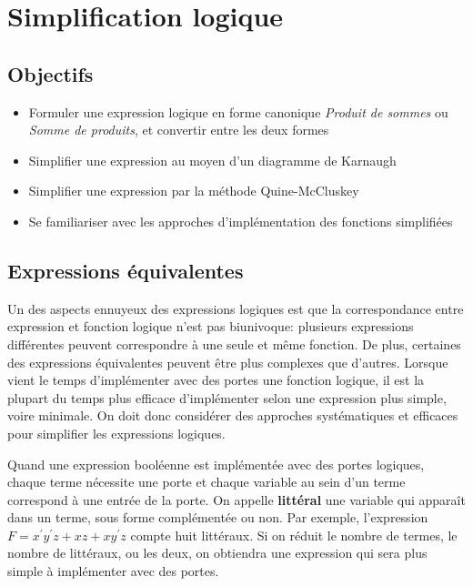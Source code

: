 \documentclass[letter, oneside]{book}
\begin{document}
\chapter{Simplification logique}
\label{sec:orgc185c51}


\section{Objectifs}
\label{sec:org7bd563f}
\begin{itemize}
\item Formuler une expression logique en forme canonique \emph{Produit
de sommes} ou \emph{Somme de produits}, et convertir entre les deux formes
\item Simplifier une expression au moyen d'un diagramme de
Karnaugh
\item Simplifier une expression par la méthode Quine-McCluskey
\item Se familiariser avec les approches d'implémentation des fonctions
simplifiées
\end{itemize}


\section{Expressions équivalentes}
\label{sec:org90f47b3}

Un des aspects ennuyeux des expressions logiques est que la
correspondance entre expression et fonction logique n'est pas
biunivoque: plusieurs expressions différentes peuvent correspondre à
une seule et même fonction. De plus, certaines des expressions
équivalentes peuvent être plus complexes que d'autres. Lorsque vient
le temps d'implémenter avec des portes une fonction logique, il est la
plupart du temps plus efficace d'implémenter selon une expression plus
simple, voire minimale. On doit donc considérer des approches
systématiques et efficaces pour simplifier les expressions logiques.

Quand une expression booléenne est implémentée avec des portes
logiques, chaque terme nécessite une porte et chaque variable au sein
d'un terme correspond à une entrée de la porte. On appelle \textbf{littéral}
une variable qui apparaît dans un terme, sous forme complémentée ou
non. Par exemple, l'expression \(F = x^\prime y^\prime z + xz +
xy^\prime z\) compte huit littéraux. Si on réduit le nombre de
termes, le nombre de littéraux, ou les deux, on obtiendra une
expression qui sera plus simple à implémenter avec des portes.
\end{document}
